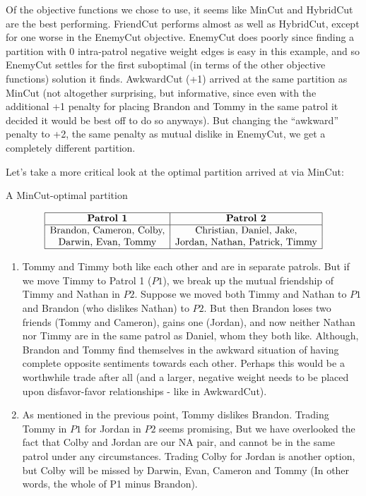 \documentclass{amsart}
\theoremstyle{definition}
\theoremstyle{remark}
\numberwithin{equation}{section}
\begin{document}
Of the objective functions we chose to use, it seems like MinCut and HybridCut are the best performing. FriendCut performs almost as well as HybridCut, except for one worse in the EnemyCut objective. EnemyCut does poorly since finding a partition with 0 intra-patrol negative weight edges is easy in this example, and so EnemyCut settles for the first suboptimal (in terms of the other objective functions) solution it finds. AwkwardCut (+1) arrived at the same partition as MinCut (not altogether surprising, but informative, since even with the additional +1 penalty for placing Brandon and Tommy in the same patrol it decided it would be best off to do so anyways). But changing the ``awkward'' penalty to +2, the same penalty as mutual dislike in EnemyCut, we get a completely different partition.

Let's take a more critical look at the optimal partition arrived at via MinCut:

\begin{table}[h]
	\caption{A MinCut-optimal partition}\label{eqtable}
	\renewcommand\arraystretch{1.5}
	\noindent\[
	\begin{array}{|c|c|}
	\hline
	\textbf{Patrol 1}&\textbf{Patrol 2}\\
	\hline
	\text{Brandon, Cameron, Colby,}&\text{Christian, Daniel, Jake,}\\
	\text{Darwin, Evan, Tommy}&\text{Jordan, Nathan, Patrick, Timmy}\\
	\hline
	\end{array}
	\]
\end{table}

\begin{enumerate}
	\item Tommy and Timmy both like each other and are in separate patrols. But if we move Timmy to Patrol 1 ($P1$), we break up the mutual friendship of Timmy and Nathan in $P2$. Suppose we moved both Timmy and Nathan to $P1$ and Brandon (who dislikes Nathan) to $P2$. But then Brandon loses two friends (Tommy and Cameron), gains one (Jordan), and now neither Nathan nor Timmy are in the same patrol as Daniel, whom they both like. Although, Brandon and Tommy find themselves in the awkward situation of having complete opposite sentiments towards each other. Perhaps this would be a worthwhile trade after all (and a larger, negative weight needs to be placed upon disfavor-favor relationships - like in AwkwardCut).
	
	\item As mentioned in the previous point, Tommy dislikes Brandon. Trading Tommy in $P1$ for Jordan in $P2$ seems promising, But we have overlooked the fact that Colby and Jordan are our NA pair, and cannot be in the same patrol under any circumstances. Trading Colby for Jordan is another option, but Colby will be missed by Darwin, Evan, Cameron and Tommy (In other words, the whole of P1 minus Brandon).
\end{enumerate}
\end{document}
